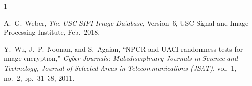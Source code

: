 \documentclass[conference]{IEEEtran}
\begin{document}
\begin{thebibliography}{1}

A.~G.~Weber, \emph{The USC-SIPI Image Database}, Version~6, USC Signal and
Image Processing Institute, Feb.\ 2018.

Y.~Wu, J.~P.~Noonan, and S.~Agaian, ``NPCR and UACI randomness tests for
image encryption,'' \emph{Cyber Journals: Multidisciplinary Journals in
Science and Technology, Journal of Selected Areas in Telecommunications
(JSAT)}, vol.~1, no.~2, pp.~31--38, 2011.

\end{thebibliography}
\end{document}
